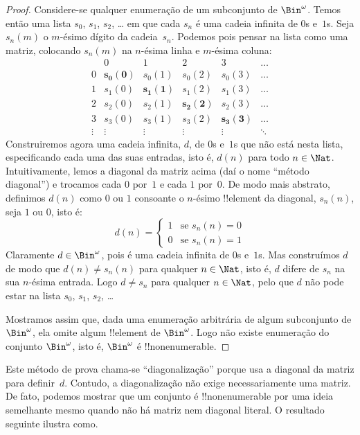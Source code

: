 \documentclass[../../../include/open-logic-section]{subfiles}
\begin{document}
\begin{proof}
Considere-se qualquer enumeração de um subconjunto de $\Bin^\omega$. Temos então
uma lista $s_{0}$, $s_{1}$, $s_{2}$, \dots{} em que cada $s_n$ é uma cadeia
infinita de $0$s e~$1$s. Seja $s_n(m)$ o $m$-ésimo dígito da cadeia~$s_n$. Podemos
pois pensar na lista como uma matriz, colocando $s_n(m)$ na $n$-ésima linha e
$m$-ésima coluna:
\[
\begin{array}{c|c|c|c|c|c}
& 0 & 1 & 2 & 3 & \dots \\\hline
0 & \mathbf{s_{0}(0)} & s_{0}(1) & s_{0}(2) & s_0(3) & \dots \\\hline
1 & s_{1}(0)& \mathbf{s_{1}(1)} & s_1(2) & s_1(3) & \dots \\\hline
2 & s_{2}(0)& s_{2}(1) & \mathbf{s_2(2)} & s_2(3) & \dots \\\hline
3 & s_{3}(0)& s_{3}(1) & s_3(2) & \mathbf{s_3(3)} & \dots \\\hline
\vdots & \vdots & \vdots & \vdots & \vdots & \mathbf{\ddots}
\end{array}
\]
Construiremos agora uma cadeia infinita, $d$, de $0$s e~$1$s que não está nesta
lista, especificando cada uma das suas entradas, isto é, $d(n)$ para todo $n \in
\Nat$. Intuitivamente, lemos a diagonal da matriz acima (daí o nome ``método
diagonal'') e trocamos cada $0$ por~$1$ e cada $1$ por~$0$. De modo mais abstrato,
definimos $d(n)$ como $0$ ou $1$ consoante o $n$-ésimo !!{element} da diagonal,
$s_n(n)$, seja $1$ ou $0$, isto é:
\[
d(n) =
\begin{cases}
1 & \text{se $s_{n}(n) = 0$}\\
0 & \text{se $s_{n}(n) = 1$}
\end{cases}
\]
Claramente $d \in \Bin^\omega$, pois é uma cadeia infinita de $0$s e~$1$s. Mas
construímos $d$ de modo que $d(n) \neq s_n(n)$ para qualquer $n \in \Nat$, isto é,
$d$ difere de $s_n$ na sua $n$-ésima entrada. Logo $d \neq s_n$ para qualquer $n\in
\Nat$, pelo que $d$ não pode estar na lista $s_0$, $s_1$, $s_2$, \dots

Mostramos assim que, dada uma enumeração arbitrária de algum subconjunto de
$\Bin^\omega$, ela omite algum !!{element} de $\Bin^\omega$. Logo não existe
enumeração do conjunto $\Bin^\omega$, isto é, $\Bin^\omega$ é !!{nonenumerable}.
\end{proof}

\begin{explain}
Este método de prova chama-se ``diagonalização'' porque usa a diagonal da matriz
para definir~$d$. Contudo, a diagonalização não exige necessariamente uma matriz.
De fato, podemos mostrar que um conjunto é !!{nonenumerable} por uma ideia
semelhante mesmo quando não há matriz nem diagonal literal. O resultado seguinte
ilustra como.
\end{explain}
\end{document}
